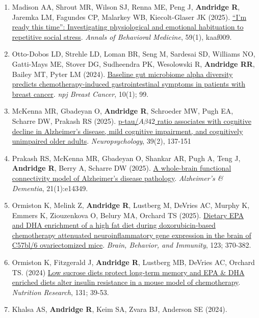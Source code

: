 \documentclass[
  english,
  letterpaper,
  DIV=11,
  numbers=noendperiod]{scrartcl}
\begin{document}
\begin{enumerate}
{  stress and epigenetic aging}. \emph{Brain, Behavior, and Immunity},
  126, 24-29.
\item
  Madison AA, Shrout MR, Wilson SJ, Renna ME, Peng J, \textbf{Andridge
  R}, Jaremka LM, Fagundes CP, Malarkey WB, Kiecolt-Glaser JK (2025).
  \href{https://doi.org/10.1093/abm/kaaf009}{``I'm ready this time'':
  Investigating physiological and emotional habituation to repetitive
  social stress}. \emph{Annals of Behavioral Medicine}, 59(1), kaaf009.
\item
  Otto-Dobos LD, Strehle LD, Loman BR, Seng M, Sardesai SD, Williams NO,
  Gatti-Mays ME, Stover DG, Sudheendra PK, Wesolowski R,
  \textbf{Andridge RR}, Bailey MT, Pyter LM (2024).
  \href{https://doi.org/10.1038/s41523-024-00707-6}{Baseline gut
  microbiome alpha diversity predicts chemotherapy-induced
  gastrointestinal symptoms in patients with breast cancer}. \emph{npj
  Breast Cancer}, 10(1); 99.
\item
  McKenna MR, Gbadeyan O, \textbf{Andridge R}, Schroeder MW, Pugh EA,
  Scharre DW, Prakash RS (2025).
  \href{https://doi.org/10.1037/neu0000987}{p-tau/\(A \beta 42\) ratio
  associates with cognitive decline in Alzheimer's disease, mild
  cognitive impairment, and cognitively unimpaired older adults}.
  \emph{Neuropsychology}, 39(2), 137-151
\item
  Prakash RS, McKenna MR, Gbadeyan O, Shankar AR, Pugh A, Teng J,
  \textbf{Andridge R}, Berry A, Scharre DW (2025).
  \href{https://doi.org/10.1002/alz.14349}{A whole-brain functional
  connectivity model of Alzheimer's disease pathology}.
  \emph{Alzheimer's \& Dementia}, 21(1):e14349.
\item
  Ormiston K, Melink Z, \textbf{Andridge R}, Lustberg M, DeVries AC,
  Murphy K, Emmers K, Ziouzenkova O, Belury MA, Orchard TS (2025).
  \href{https://doi.org/10.1016/j.bbi.2024.09.021}{Dietary EPA and DHA
  enrichment of a high fat diet during doxorubicin-based chemotherapy
  attenuated neuroinflammatory gene expression in the brain of C57bl/6
  ovariectomized mice}. \emph{Brain, Behavior, and Immunity}, 123;
  370-382.
\item
  Ormiston K, Fitzgerald J, \textbf{Andridge R}, Lustberg MB, DeVries
  AC, Orchard TS. (2024)
  \href{https://doi.org/10.1016/j.nutres.2024.09.004}{Low sucrose diets
  protect long-term memory and EPA \& DHA enriched diets alter insulin
  resistance in a mouse model of chemotherapy}. \emph{Nutrition
  Research}, 131; 39-53.
\item
  Khalsa AS, \textbf{Andridge R}, Keim SA, Zvara BJ, Anderson SE (2024).

\end{enumerate}
\end{document}
